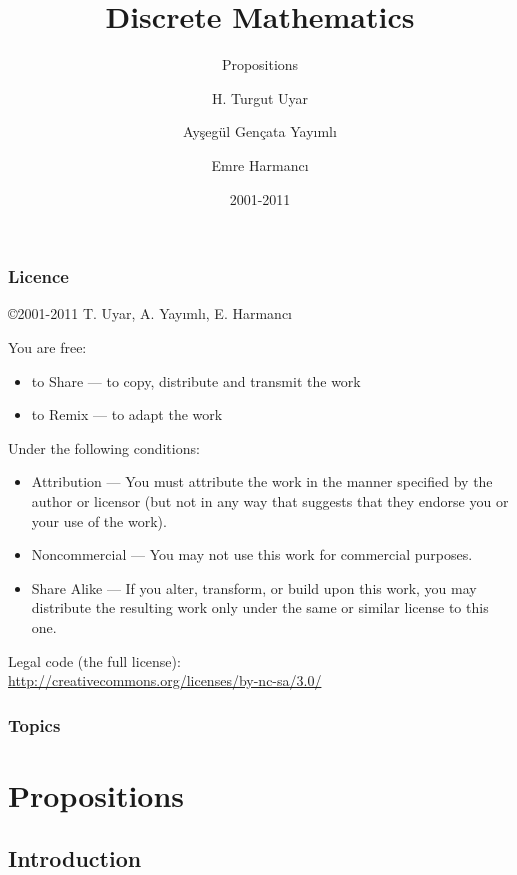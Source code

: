 \documentclass[dvipsnames]{beamer}
\title{Discrete Mathematics}
\subtitle{Propositions}
\author{H. Turgut Uyar \and Ayşegül Gençata Yayımlı \and Emre Harmancı}
\date{2001-2011}
\begin{document}
\begin{frame}
  \titlepage
\end{frame}

\begin{frame}
  \frametitle{Licence}

  \hfill
  \copyright 2001-2011 T. Uyar, A. Yayımlı, E. Harmancı

  \vfill
  \begin{tiny}
    You are free:
    \begin{itemize}
      \item to Share — to copy, distribute and transmit the work
      \item to Remix — to adapt the work
    \end{itemize}

    Under the following conditions:
    \begin{itemize}
      \item Attribution — You must attribute the work in the manner specified by
        the author or licensor (but not in any way that suggests that they
        endorse you or your use of the work).

      \item Noncommercial — You may not use this work for commercial purposes.

      \item Share Alike — If you alter, transform, or build upon this work, you
        may distribute the resulting work only under the same or similar license
        to this one.
    \end{itemize}
  \end{tiny}

  \vfill
  Legal code (the full license):\\
  \url{http://creativecommons.org/licenses/by-nc-sa/3.0/}
\end{frame}

\begin{frame}
  \frametitle{Topics}
  \tableofcontents
\end{frame}

\section{Propositions}

\subsection{Introduction}
\end{document}
